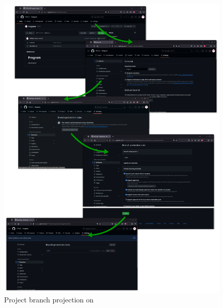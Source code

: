 \begin{figure}[!p]
\includegraphics[width=1.0\textwidth,keepaspectratio=true,draft=\ddst]{img/hosts/github/branch.eps} 
\caption{Project branch projection on \github\label{bgithub}}
\end{figure}

